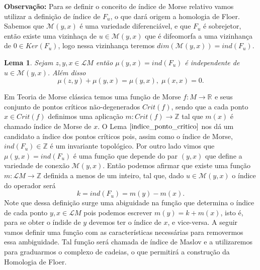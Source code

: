 \documentclass[12pt]{book}
\newtheorem{lema}[teorema]{Lema}
\newcommand{\real}[1]{\mathbb{R}^{#1}}
\newcommand{\solucoesperiodicascontrateis}{\mathcal{L}M}
\begin{document}
	\textbf{Observação:} Para se definir o conceito de índice de Morse relativo vamos utilizar a definição de índice de $F_{u}$, o que dará origem a homologia de Floer. Sabemos que $\mathcal{M}(y,x)$ é uma variedade diferenciável, e que $F_{u}$ é sobrejetor, então existe uma vizinhaça de $u \in \mathcal{M}(y,x)$ que é difeomorfa a uma vizinhança de $0 \in Ker(F_{u})$, logo nessa vizinhança teremos $dim(\mathcal{M}(y,x)) = ind(F_{u})$.
	
	\begin{lema}\label{indice_ponto_critico} Sejam $z,y,x \in \solucoesperiodicascontrateis$ então $\mu(y,x) = ind(F_{u})$ é independente de $u \in \mathcal{M}(y,x)$. Além disso
		$$
		\mu(z,y) + \mu(y,x) = \mu(y,x), \; \mu(x,x) = 0.   
		$$
	\end{lema}
	Em Teoria de Morse clássica temos uma função de Morse $f:M\to \real{}$ e seus conjunto de pontos críticos não-degenerados $Crit(f)$, sendo que a cada ponto $x \in Crit(f)$ definimos uma aplicação $m:Crit(f) \to \mathbb{Z}$ tal que $m(x)$ é chamado índice de Morse de $x$.	O Lema $\ref{indice_ponto_critico}$ nos dá um candidato a índice dos pontos críticos pois, assim como o índice de Morse, $ind(F_{u}) \in \mathbb{Z}$ é um invariante topológico. Por outro lado vimos que $\mu(y,x) = ind(F_{u})$ é uma função que depende do par $(y, x)$ que define a variedade de conexão $\mathcal{M}(y, x)$. Então podemos afirmar que existe uma função $m : \solucoesperiodicascontrateis \to \mathbb{Z}$ definida a menos de um inteiro, tal que, dado $u \in \mathcal{M}(y,x)$ o índice do operador será 
	$$
	k = ind(F_{u}) = m(y)-m(x).
	$$
	Note que dessa definição surge uma abiguidade na função que determina o índice de cada ponto $y,x \in \solucoesperiodicascontrateis$ pois podemos escrever $m(y) = k+m(x)$, isto é, para se obter o índide de $y$ devemos ter o índice de $x$, e vice-versa. A seguir vamos definir uma função com as características necessárias para removermos essa ambiguidade. Tal função será chamada de índice de Maslov e a utilizaremos para graduarmos o complexo de cadeias, o que permitirá a construção da Homologia de Floer. 
	
\end{document}
